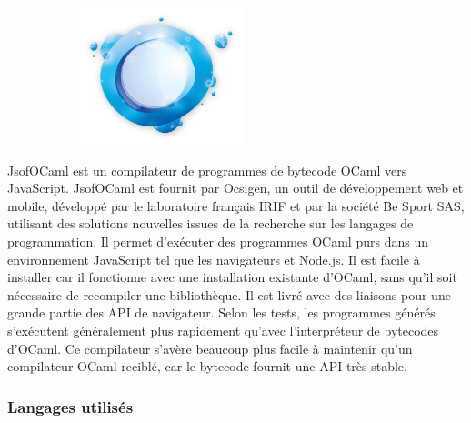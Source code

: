 \documentclass{article}
\begin{document}
\begin{figure}[h!]
	\centering
  	\begin{subfigure}[b]{0.25\linewidth}
	\includegraphics[width=\linewidth]{ocs.png}
  	\end{subfigure}
\end{figure}

JsofOCaml est un compilateur de programmes de bytecode OCaml vers JavaScript.
\newline
JsofOCaml est fournit par Ocsigen, un outil de développement web et mobile, développé par le laboratoire français IRIF et par la société Be Sport SAS, utilisant des solutions nouvelles issues de la recherche sur les langages de programmation.
\newline
Il permet d’exécuter des programmes OCaml purs dans un environnement JavaScript tel que les navigateurs et Node.js. Il est facile à installer car il fonctionne avec une installation existante d'OCaml, sans qu'il soit nécessaire de recompiler une bibliothèque. Il est livré avec des liaisons pour une grande partie des API de navigateur. Selon les tests, les programmes générés s'exécutent généralement plus rapidement qu'avec l'interpréteur de bytecodes d'OCaml. Ce compilateur s'avère beaucoup plus facile à maintenir qu'un compilateur OCaml reciblé, car le bytecode fournit une API très stable.

\subsubsection{Langages utilisés}
\end{document}

